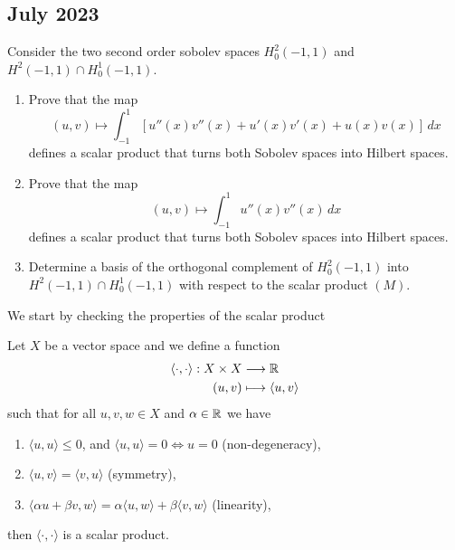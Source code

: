 \newpage
\subsection{July 2023}
\begin{exercise}
    Consider the two second order sobolev spaces \(H^2_0(-1, 1)\) and \(H^2(-1, 1) \cap H^1_0(-1, 1)\).
    \begin{enumerate}
        \item Prove that the map
              \[
                  (u, v) \longmapsto \int_{-1}^1 \left[ u''(x) v''(x) + u'(x) v'(x) + u(x) v(x) \right] \, dx
              \]
              defines a scalar product that turns both Sobolev spaces into Hilbert spaces.
        \item Prove that the map
              \[
                  (u, v) \longmapsto \int_{-1}^1 u''(x) v''(x) \, dx
                  \tag{(M)}
              \]
              defines a scalar product that turns both Sobolev spaces into Hilbert spaces.
        \item Determine a basis of the orthogonal complement of \(H^2_0(-1, 1)\) into
              \(H^2(-1, 1)\cap H^1_0(-1, 1)\) with respect to the scalar product \((M)\).
    \end{enumerate}
\end{exercise}
We start by checking the properties of the scalar product
\begin{remark}
    Let \(X\) be a vector space and we define a function
    \[
        \begin{aligned}
            \langle \cdot, \cdot \rangle : X \times X & \longrightarrow \mathbb{R}            \\
            (u, v)                                    & \longmapsto \langle u, v \rangle
        \end{aligned}
    \]
    such that for all \(u, v, w \in X\) and \(\alpha \in \mathbb{R}\) we have
    \begin{enumerate}
        \item \(\langle u, u \rangle \leq 0\), and \(\langle u, u \rangle = 0 \iff u = 0\) (non-degeneracy),
        \item \(\langle u, v \rangle = \langle v, u \rangle\) (symmetry),
        \item \(\langle \alpha u + \beta v, w \rangle = \alpha \langle u, w \rangle + \beta \langle v, w \rangle\) (linearity),
    \end{enumerate}
    then \(\langle \cdot, \cdot \rangle\) is a scalar product.
\end{remark}

